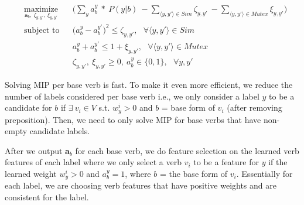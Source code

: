 \scriptsize
\begin{equation}
\begin{aligned}
& \operatorname*{maximize}_{\textbf{a}_b,\ \zeta_{y, y'},\ \xi_{y, y'}}
& & \bigg( \sum_{y} a_{b}^{y}\ *\ P(y | b)\ - \sum_{\langle y, y'\rangle \in Sim} \zeta_{y, y'}\ - \sum_{\langle y, y'\rangle \in Mutex} \xi_{y, y'}\bigg) \\ 
& \text{subject to} & & \big(a_{b}^{y} - a_{b}^{y'}\big)^2 \leq \zeta_{y, y'},\ \ \ \forall \langle y, y'\rangle \in Sim \\
& & & a_{b}^{y} + a_{b}^{y'} \leq 1 + \xi_{y, y'},\ \ \ \forall \langle y, y'\rangle \in Mutex \\
& & & \zeta_{y, y'},\ \xi_{y, y'} \geq 0,\ a_{b}^{y} \in \{0, 1\},\ \ \ \forall y, y'
\label{eqn:mip}
\end{aligned}
\end{equation}
\normalsize

Solving MIP per base verb is fast. To make it even more efficient, we reduce the number of labels considered per base verb i.e., we only consider a label $y$ to be a candidate for $b$ if $\exists\ v_i \in V$ s.t. $w_y^i > 0$ and $b$ = base form of $v_i$ (after removing preposition). Then, we need to only solve MIP for base verbs that have non-empty candidate labels. 

After we output \textbf{a}$_b$ for each base verb, we do feature selection on the learned verb features of each label where we only select a verb $v_i$ to be a feature for $y$ if the learned weight $w_y^i > 0$ and $a_b^{y} = 1$, where $b$ = the base form of $v_i$. Essentially for each label, we are choosing verb features that have positive weights and are consistent for the label.